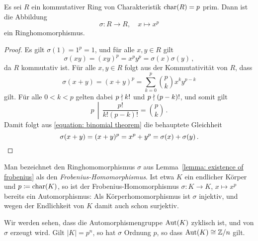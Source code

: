 \section{}





\addtocounter{subsection}{1}





\addtocounter{subsection}{1}





\addtocounter{subsection}{1}





\subsection{}

\begin{lemma}
  \label{lemma: existence of frobenius}
  Es sei $R$ ein kommutativer Ring von Charakteristik $\operatorname{char}(R) = p$ prim.
  Dann ist die Abbildung
  \[
            \sigma
    \colon  R
    \to     R,
    \quad   x
    \mapsto x^p
  \]
  ein Ringhomomorphismus.
\end{lemma}

\begin{proof}
  Es gilt $\sigma(1) = 1^p = 1$, und für alle $x, y \in R$ gilt
  \[
      \sigma(xy)
    = (xy)^p
    = x^p y^p
    = \sigma(x) \sigma(y) \,,
  \]
  da $R$ kommutativ ist.
  Für alle $x, y \in R$ folgt aus der Kommutativität von $R$, dass
  \begin{equation}
    \label{equation: binomial theorem}
      \sigma(x + y)
    = (x + y)^p
    = \sum_{k=0}^p \binom{p}{k} x^k y^{p-k}
  \end{equation}
  gilt.
  Für alle $0 < k < p$ gelten dabei $p \mathrel{\nmid} k!$ und $p \mathrel{\nmid} (p-k)!$, und somit gilt
  \[
    \left.        p
    \,\middle|\,  \frac{p!}{k! (p-k)!} \right.
    =             \binom{p}{k} \,.
  \]
  Damit folgt aus \eqref{equation: binomial theorem} die behauptete Gleichheit
  \[
      \sigma(x + y)
    = (x + y)^p
    = x^p + y^p
    = \sigma(x) + \sigma(y) \,.
    \qedhere
  \]
\end{proof}

\begin{remark}
  Man bezeichnet den Ringhomomorphismus $\sigma$ aus Lemma~\ref{lemma: existence of frobenius} als den \emph{Frobenius-Homomorphismus}.
  Ist etwa $K$ ein endlicher Körper und $p \coloneqq \operatorname{char}(K)$, so ist der Frobenius-Homomorphismus $\sigma \colon K \to K$, $x \mapsto x^p$ bereits ein Automorphismus:
  Als Körperhomomorphismus ist $\sigma$ injektiv, und wegen der Endlichkeit von $K$ damit auch schon surjektiv.
  
  Wir werden sehen, dass die Automorphismengruppe $\operatorname{Aut}(K)$ zyklisch ist, und von $\sigma$ erzeugt wird.
  Gilt $|K| = p^n$, so hat $\sigma$ Ordnung $p$, so dass $\operatorname{Aut}(K) \cong \mathbb{Z}/n$ gilt.
\end{remark}


